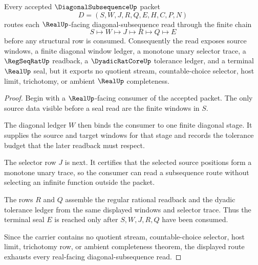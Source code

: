 \begin{theorem}
\label{thm:diagonal-subsequence-regular-readback-route}
Every accepted $\DiagonalSubsequenceUp$ packet
$$
D=(S,W,J,R,Q,E,H,C,P,N)
$$
routes each $\RealUp$-facing diagonal-subsequence read through the finite chain
$$
S \longmapsto W \longmapsto J \longmapsto R \longmapsto Q \longmapsto E
$$
before any structural row is consumed. Consequently the read exposes source windows, a finite diagonal window ledger, a monotone unary selector trace, a $\RegSeqRatUp$ readback, a $\DyadicRatCoreUp$ tolerance ledger, and a terminal $\RealUp$ seal, but it exports no quotient stream, countable-choice selector, host limit, trichotomy, or ambient $\RealUp$ completeness.
\end{theorem}
\begin{proof}
Begin with a $\RealUp$-facing consumer of the accepted packet. The only source data visible before a seal read are the finite windows in $S$.

The diagonal ledger $W$ then binds the consumer to one finite diagonal stage. It supplies the source and target windows for that stage and records the tolerance budget that the later readback must respect.

The selector row $J$ is next. It certifies that the selected source positions form a monotone unary trace, so the consumer can read a subsequence route without selecting an infinite function outside the packet.

The rows $R$ and $Q$ assemble the regular rational readback and the dyadic tolerance ledger from the same displayed windows and selector trace. Thus the terminal seal $E$ is reached only after $S,W,J,R,Q$ have been consumed.

Since the carrier contains no quotient stream, countable-choice selector, host limit, trichotomy row, or ambient completeness theorem, the displayed route exhausts every real-facing diagonal-subsequence read.
\end{proof}

